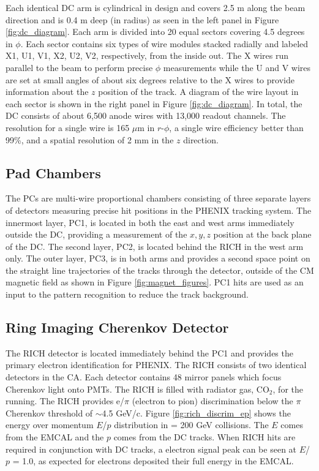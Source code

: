 Each identical DC arm is cylindrical in design and covers 2.5 m along the beam direction and is 0.4 m deep (in radius) as seen in the left panel in Figure \ref{fig:dc_diagram}. Each arm is divided into 20 equal sectors covering 4.5 degrees in $\phi$. Each sector contains six types of wire modules stacked radially and labeled X1, U1, V1, X2, U2, V2, respectively, from the inside out. The X wires run parallel to the beam to perform precise $\phi$ measurements while the U and V wires are set at small angles of about six degrees relative to the X wires to provide information about the $z$ position of the track. A diagram of the wire layout in each sector is shown in the right panel in Figure \ref{fig:dc_diagram}. In total, the DC consists of about 6,500 anode wires with 13,000 readout channels. The  resolution for a single wire is 165 $\mu$m in $r$-$\phi$, a single wire efficiency better than 99\%, and a spatial resolution of  2 mm in the $z$ direction.

\subsection{Pad Chambers}
The PCs are multi-wire proportional chambers consisting of three separate layers of detectors measuring precise hit positions in the PHENIX tracking system. The innermost layer, PC1, is located in both the east and west arms immediately outside the DC, providing a measurement of the $x, y, z$ position at the back plane of the DC. The second layer, PC2, is located behind the RICH in the west arm only. The outer layer, PC3, is in both arms and provides a second space point on the straight line trajectories of the tracks through the detector, outside of the CM magnetic field as shown in Figure \ref{fig:magnet_figures}. PC1 hits are used as an input to the pattern recognition to reduce the track background.

\subsection{Ring Imaging Cherenkov Detector}
The RICH detector is located immediately behind the PC1 and provides the primary electron identification for PHENIX. The RICH consists of two identical detectors in the CA. Each detector contains 48 mirror panels which focus Cherenkov light onto PMTs. The RICH is filled with radiator gas, CO$_2$, for the \pau running. The RICH provides e/$\pi$ (electron to pion) discrimination below the $\pi$ Cherenkov threshold of $\sim$4.5 GeV/c. Figure \ref{fig:rich_discrim_ep} shows the energy over momentum $E$/$p$ distribution in \auau \sqsn = 200 GeV collisions. The $E$ comes from the EMCAL and the $p$ comes from the DC tracks. When RICH hits are required in conjunction with DC tracks, a electron signal peak can be seen at $E$/$p$ = 1.0, as expected for electrons deposited their full energy in the EMCAL.

